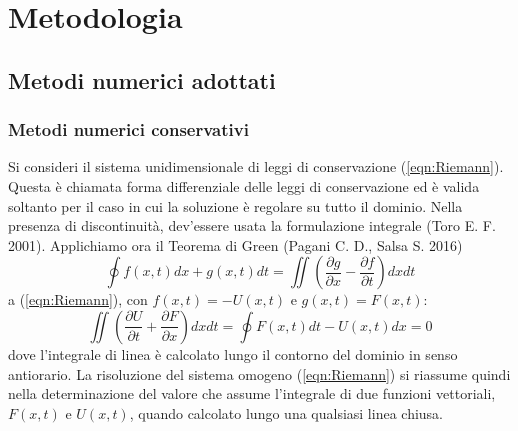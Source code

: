\documentclass[12pt]{article} %
\begin{document}
\section{Metodologia}
\subsection{Metodi numerici adottati}
\subsubsection{Metodi numerici conservativi}
\noindent Si consideri il sistema unidimensionale di leggi di conservazione (\ref{eqn:Riemann}). Questa è chiamata forma differenziale delle leggi di conservazione ed è valida soltanto per il caso in cui la soluzione è regolare su tutto il dominio. Nella presenza di discontinuità, dev'essere usata la formulazione integrale (Toro E. F. 2001).
\noindent Applichiamo ora il Teorema di Green (Pagani C. D., Salsa S. 2016)
\begin{equation}
    \oint f(x,t)dx + g(x,t)dt = \iint \left(\frac{\partial g}{\partial x}-\frac{\partial f}{\partial t}\right)dxdt
    \label{eqn:teorema_Green}
\end{equation}
\noindent a (\ref{eqn:Riemann}), con $f(x,t) = -U(x,t)$ e $g(x,t) = F(x,t)$:
\begin{equation}
    \iint \left(\frac{\partial U}{\partial t}+\frac{\partial F}{\partial x}\right)dxdt = \oint F(x,t)dt - U(x,t)dx = 0
    \label{eqn:teorema_Green_app_Riemann}
\end{equation}
\noindent dove l'integrale di linea è calcolato lungo il contorno del dominio in senso antiorario. La risoluzione del sistema omogeno (\ref{eqn:Riemann}) si riassume quindi nella determinazione del valore che assume l'integrale di due funzioni vettoriali, $F(x,t)$ e $U(x,t)$, quando calcolato lungo una qualsiasi linea chiusa. 
\end{document}
